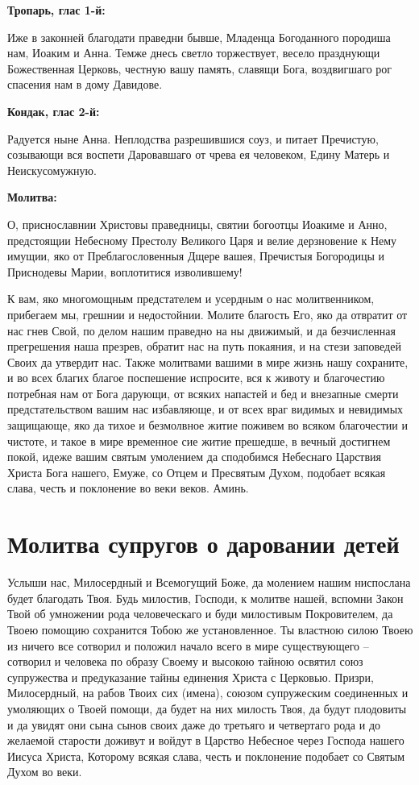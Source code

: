 \bfseries Тропарь, глас 1-й:\normalfont{}


Иже в законней благодати праведни бывше, Младенца Богоданного породиша нам, Иоаким и Анна. Темже днесь светло торжествует, весело празднующи Божественная Церковь, честную вашу память, славящи Бога, воздвигшаго рог спасения нам в дому Давидове.


\medskip
\bfseries Кондак, глас 2-й:\normalfont{}


Радуется ныне Анна. Неплодства разрешившися соуз, и питает Пречистую, созывающи вся воспети Даровавшаго от чрева ея человеком, Едину Матерь и Неискусомужную.


\medskip
\bfseries Молитва:\normalfont{}


О, приснославнии Христовы праведницы, святии богоотцы Иоакиме и Анно, предстоящии Небесному Престолу Великого Царя и велие дерзновение к Нему имущии, яко от Преблагословенныя Дщере вашея, Пречистыя Богородицы и Приснодевы Марии, воплотитися изволившему!

К вам, яко многомощным предстателем и усердным о нас молитвенником, прибегаем мы, грешнии и недостойнии. Молите благость Его, яко да отвратит от нас гнев Свой, по делом нашим праведно на ны движимый, и да безчисленная прегрешения наша презрев, обратит нас на путь покаяния, и на стези заповедей Своих да утвердит нас. Также молитвами вашими в мире жизнь нашу сохраните, и во всех благих благое поспешение испросите, вся к животу и благочестию потребная нам от Бога дарующи, от всяких напастей и бед и внезапные смерти предстательством вашим нас избавляюще, и от всех враг видимых и невидимых защищающе, яко да тихое и безмолвное житие поживем во всяком благочестии и чистоте, и такое в мире временное сие житие прешедше, в вечный достигнем покой, идеже вашим святым умолением да сподобимся Небеснаго Царствия Христа Бога нашего, Емуже, со Отцем и Пресвятым Духом, подобает всякая слава, честь и поклонение во веки веков. Аминь.

\section{Молитва супругов о даровании детей}
 


Услыши нас, Милосердный и Всемогущий Боже, да молением нашим ниспослана будет благодать Твоя. Будь милостив, Господи, к молитве нашей, вспомни Закон Твой об умножении рода человеческаго и буди милостивым Покровителем, да Твоею помощию сохранится Тобою же установленное. Ты властною силою Твоею из ничего все сотворил и положил начало всего в мире существующего – сотворил и человека по образу Своему и высокою тайною освятил союз супружества и предуказание тайны единения Христа с Церковью. Призри, Милосердный, на рабов Твоих сих (имена), союзом супружеским соединенных и умоляющих о Твоей помощи, да будет на них милость Твоя, да будут плодовиты и да увидят они сына сынов своих даже до третьяго и четвертаго рода и до желаемой старости доживут и войдут в Царство Небесное через Господа нашего Иисуса Христа, Которому всякая слава, честь и поклонение подобает со Святым Духом во веки. 


